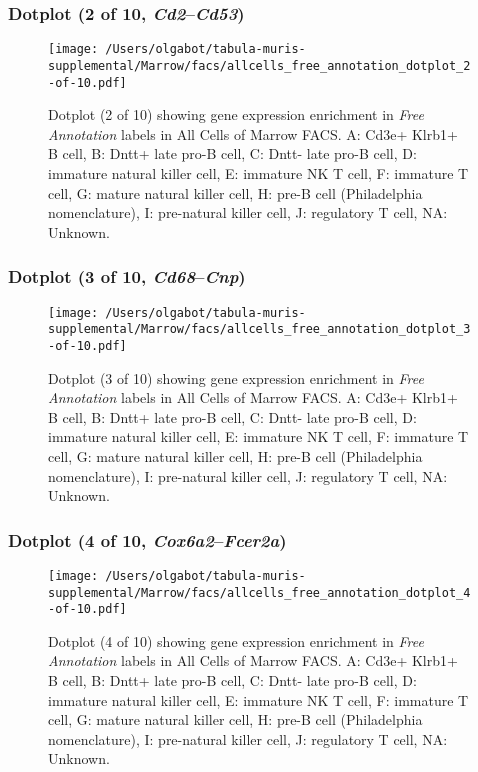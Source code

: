 \clearpage

\subsubsection{Dotplot (2 of 10, \emph{Cd2}--\emph{Cd53})}
\begin{figure}[h]
\centering
\texttt{[image: /Users/olgabot/tabula-muris-supplemental/Marrow/facs/allcells\_free\_annotation\_dotplot\_2-of-10.pdf]}

\caption{ Dotplot (2 of 10)  showing gene expression enrichment in \emph{Free Annotation} labels in All Cells of Marrow FACS. A: Cd3e+ Klrb1+ B cell, B: Dntt+ late pro-B cell, C: Dntt- late pro-B cell, D: immature natural killer cell, E: immature NK T cell, F: immature T cell, G: mature natural killer cell, H: pre-B cell (Philadelphia nomenclature), I: pre-natural killer cell, J: regulatory T cell, NA: Unknown.}
\end{figure}


\clearpage

\subsubsection{Dotplot (3 of 10, \emph{Cd68}--\emph{Cnp})}
\begin{figure}[h]
\centering
\texttt{[image: /Users/olgabot/tabula-muris-supplemental/Marrow/facs/allcells\_free\_annotation\_dotplot\_3-of-10.pdf]}

\caption{ Dotplot (3 of 10)  showing gene expression enrichment in \emph{Free Annotation} labels in All Cells of Marrow FACS. A: Cd3e+ Klrb1+ B cell, B: Dntt+ late pro-B cell, C: Dntt- late pro-B cell, D: immature natural killer cell, E: immature NK T cell, F: immature T cell, G: mature natural killer cell, H: pre-B cell (Philadelphia nomenclature), I: pre-natural killer cell, J: regulatory T cell, NA: Unknown.}
\end{figure}


\clearpage

\subsubsection{Dotplot (4 of 10, \emph{Cox6a2}--\emph{Fcer2a})}
\begin{figure}[h]
\centering
\texttt{[image: /Users/olgabot/tabula-muris-supplemental/Marrow/facs/allcells\_free\_annotation\_dotplot\_4-of-10.pdf]}

\caption{ Dotplot (4 of 10)  showing gene expression enrichment in \emph{Free Annotation} labels in All Cells of Marrow FACS. A: Cd3e+ Klrb1+ B cell, B: Dntt+ late pro-B cell, C: Dntt- late pro-B cell, D: immature natural killer cell, E: immature NK T cell, F: immature T cell, G: mature natural killer cell, H: pre-B cell (Philadelphia nomenclature), I: pre-natural killer cell, J: regulatory T cell, NA: Unknown.}
\end{figure}


